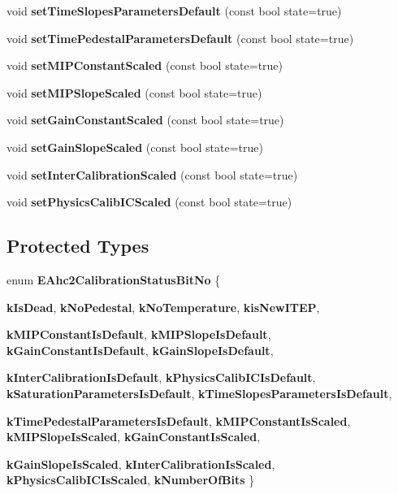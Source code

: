 \begin{DoxyCompactItemize}
\item 
void {\bfseries setTimeSlopesParametersDefault} (const bool state=true)\label{classCALICE_1_1Ahc2CalibrationStatusBits_a50e4cfea2375a925be6e50fe82eda241}

\item 
void {\bfseries setTimePedestalParametersDefault} (const bool state=true)\label{classCALICE_1_1Ahc2CalibrationStatusBits_a8f62dcfae9efb8ab82b18f90448aec7a}

\item 
void {\bfseries setMIPConstantScaled} (const bool state=true)\label{classCALICE_1_1Ahc2CalibrationStatusBits_a7b90ee374016c59fe0931a1e42840941}

\item 
void {\bfseries setMIPSlopeScaled} (const bool state=true)\label{classCALICE_1_1Ahc2CalibrationStatusBits_a2e2221cf01d5766f3f3ff1d66fc9364a}

\item 
void {\bfseries setGainConstantScaled} (const bool state=true)\label{classCALICE_1_1Ahc2CalibrationStatusBits_ae6dcfafd7074e5915ae7adb2e7c2101d}

\item 
void {\bfseries setGainSlopeScaled} (const bool state=true)\label{classCALICE_1_1Ahc2CalibrationStatusBits_a7c8db965152f0f13fb2d0b2278136288}

\item 
void {\bfseries setInterCalibrationScaled} (const bool state=true)\label{classCALICE_1_1Ahc2CalibrationStatusBits_ad918faf4d0f89479592661f385559ec6}

\item 
void {\bfseries setPhysicsCalibICScaled} (const bool state=true)\label{classCALICE_1_1Ahc2CalibrationStatusBits_a214becc89abb9ebfaa913884f848d59c}

\end{DoxyCompactItemize}
\subsection*{Protected Types}
\begin{DoxyCompactItemize}
\item 
enum {\bf EAhc2CalibrationStatusBitNo} \{ \par
{\bf kIsDead}, 
{\bf kNoPedestal}, 
{\bf kNoTemperature}, 
{\bf kisNewITEP}, 
\par
{\bf kMIPConstantIsDefault}, 
{\bf kMIPSlopeIsDefault}, 
{\bf kGainConstantIsDefault}, 
{\bf kGainSlopeIsDefault}, 
\par
{\bf kInterCalibrationIsDefault}, 
{\bf kPhysicsCalibICIsDefault}, 
{\bf kSaturationParametersIsDefault}, 
{\bf kTimeSlopesParametersIsDefault}, 
\par
{\bf kTimePedestalParametersIsDefault}, 
{\bf kMIPConstantIsScaled}, 
{\bf kMIPSlopeIsScaled}, 
{\bf kGainConstantIsScaled}, 
\par
{\bf kGainSlopeIsScaled}, 
{\bf kInterCalibrationIsScaled}, 
{\bf kPhysicsCalibICIsScaled}, 
{\bfseries kNumberOfBits}
 \}
\end{DoxyCompactItemize}


